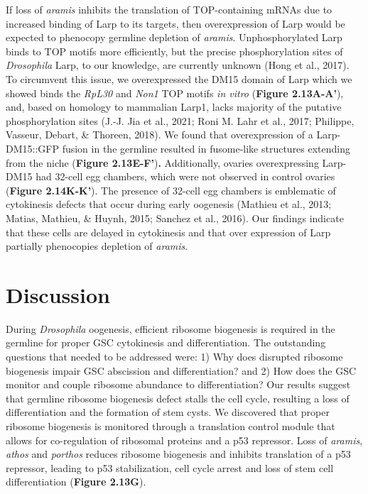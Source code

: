 \documentclass[12pt,oneside]{reedthesis}
\begin{document}
If loss of \emph{aramis} inhibits the translation of TOP-containing mRNAs due
to increased binding of Larp to its targets, then overexpression of Larp
would be expected to phenocopy germline depletion of \emph{aramis}.
Unphosphorylated Larp binds to TOP motifs more efficiently, but the
precise phosphorylation sites of \emph{Drosophila} Larp, to our knowledge,
are currently unknown (Hong et al., 2017). To circumvent this issue, we
overexpressed the DM15 domain of Larp which we showed binds the \emph{RpL30}
and \emph{Non1} TOP motifs \emph{in vitro} (\textbf{Figure 2.13A-A'}), and, based on
homology to mammalian Larp1, lacks majority of the putative
phosphorylation sites (J.-J. Jia et al., 2021; Roni M. Lahr et al., 2017; Philippe, Vasseur, Debart, \& Thoreen, 2018). We found that overexpression of a
Larp-DM15::GFP fusion in the germline resulted in fusome-like structures
extending from the niche (\textbf{Figure 2.13E-F'})\textbf{.} Additionally, ovaries
overexpressing Larp-DM15 had 32-cell egg chambers, which were not
observed in control ovaries (\textbf{Figure 2.14K-K'}). The presence of 32-cell
egg chambers is emblematic of cytokinesis defects that occur during
early oogenesis (Mathieu et al., 2013; Matias, Mathieu, \& Huynh, 2015; Sanchez et al., 2016). Our
findings indicate that these cells are delayed in cytokinesis and that
over expression of Larp partially phenocopies depletion of \emph{aramis}.

\hypertarget{discussion}{%
\section{Discussion}\label{discussion}}

During \emph{Drosophila} oogenesis, efficient ribosome biogenesis is required
in the germline for proper GSC cytokinesis and differentiation. The
outstanding questions that needed to be addressed were: 1) Why does
disrupted ribosome biogenesis impair GSC abscission and differentiation?
and 2) How does the GSC monitor and couple ribosome abundance to
differentiation? Our results suggest that germline ribosome biogenesis
defect stalls the cell cycle, resulting a loss of differentiation and
the formation of stem cysts. We discovered that proper ribosome
biogenesis is monitored through a translation control module that allows
for co-regulation of ribosomal proteins and a p53 repressor. Loss of
\emph{aramis}, \emph{athos} and \emph{porthos} reduces ribosome biogenesis and inhibits
translation of a p53 repressor, leading to p53 stabilization, cell cycle
arrest and loss of stem cell differentiation (\textbf{Figure 2.13G}).
\end{document}
